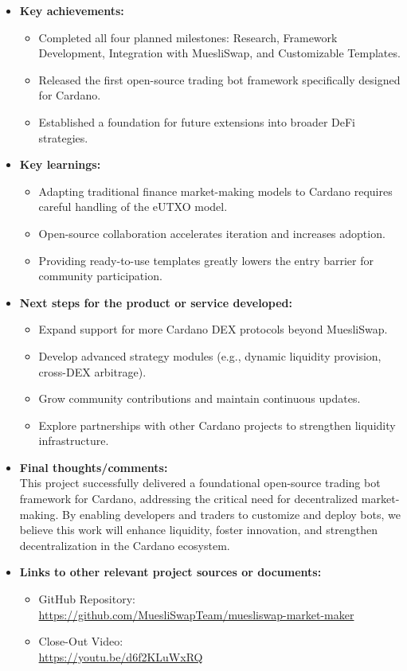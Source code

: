 \documentclass[11pt]{article}
\begin{document}
\begin{itemize}[leftmargin=1cm]
    \item \textbf{Key achievements:}
    \begin{itemize}
        \item Completed all four planned milestones: Research, Framework Development, Integration with MuesliSwap, and Customizable Templates.
        \item Released the first open-source trading bot framework specifically designed for Cardano.
        \item Established a foundation for future extensions into broader DeFi strategies.
    \end{itemize}

    \item \textbf{Key learnings:}
    \begin{itemize}
        \item Adapting traditional finance market-making models to Cardano requires careful handling of the eUTXO model.
        \item Open-source collaboration accelerates iteration and increases adoption.
        \item Providing ready-to-use templates greatly lowers the entry barrier for community participation.
    \end{itemize}

    \item \textbf{Next steps for the product or service developed:}
    \begin{itemize}
        \item Expand support for more Cardano DEX protocols beyond MuesliSwap.
        \item Develop advanced strategy modules (e.g., dynamic liquidity provision, cross-DEX arbitrage).
        \item Grow community contributions and maintain continuous updates.
        \item Explore partnerships with other Cardano projects to strengthen liquidity infrastructure.
    \end{itemize}

    \item \textbf{Final thoughts/comments:}\\
    This project successfully delivered a foundational open-source trading bot framework for Cardano, addressing the critical need for decentralized market-making. By enabling developers and traders to customize and deploy bots, we believe this work will enhance liquidity, foster innovation, and strengthen decentralization in the Cardano ecosystem.

    \item \textbf{Links to other relevant project sources or documents:}
    \begin{itemize}
        \item GitHub Repository:\\ \url{https://github.com/MuesliSwapTeam/muesliswap-market-maker}
        \item Close-Out Video:\\ \url{https://youtu.be/d6f2KLuWxRQ}
    \end{itemize}
\end{itemize}
\end{document}
